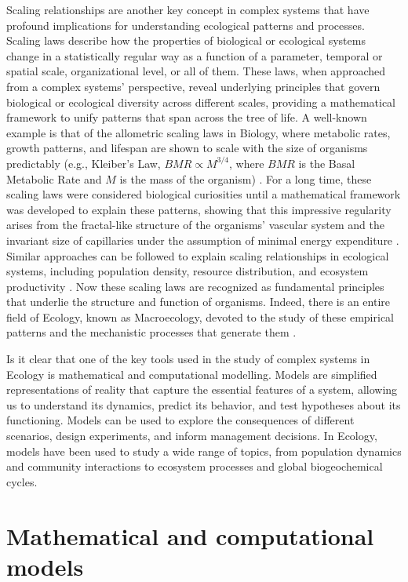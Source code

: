 Scaling relationships are another key concept in complex systems that have
profound implications for understanding ecological patterns and processes.
Scaling laws describe how the properties of biological or ecological systems
change in a statistically regular way as a function of a parameter, temporal or
spatial scale, organizational level, or all of them. These laws, when
approached from a complex systems' perspective, reveal underlying principles
that govern biological or ecological diversity across different scales,
providing a mathematical framework to unify patterns that span across the tree
of life. A well-known example is that of the allometric scaling laws in
Biology, where metabolic rates, growth patterns, and lifespan are shown to
scale with the size of organisms predictably (e.g., Kleiber's Law,
$BMR \propto M^{3/4}$, where $BMR$ is the Basal Metabolic Rate and $M$ is the
mass of the organism) \cite{Peters1983}. For a long time, these scaling laws
were considered biological curiosities until a mathematical framework was
developed to explain these patterns, showing that this impressive regularity
arises from the fractal-like structure of the organisms' vascular system and
the invariant size of capillaries under the assumption of minimal energy
expenditure \cite{West1997}. Similar approaches can be followed to explain
scaling relationships in ecological systems, including population density,
resource distribution, and ecosystem productivity \cite{Brown2004}. Now these
scaling laws are recognized as fundamental principles that underlie the
structure and function of organisms. Indeed, there is an entire field of
Ecology, known as Macroecology, devoted to the study of these empirical
patterns and the mechanistic processes that generate them
\cite{Brown1995Macroecology}.

Is it clear that one of the key tools used in the study of complex systems in
Ecology is mathematical and computational modelling. Models are simplified
representations of reality that capture the essential features of a system,
allowing us to understand its dynamics, predict its behavior, and test
hypotheses about its functioning. Models can be used to explore the
consequences of different scenarios, design experiments, and inform management
decisions. In Ecology, models have been used to study a wide range of topics,
from population dynamics and community interactions to ecosystem processes and
global biogeochemical cycles.

\section{\label{sec:Mathematical and computational models} Mathematical and
  computational models}

